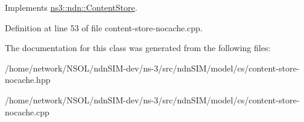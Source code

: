Implements \hyperlink{classns3_1_1ndn_1_1ContentStore_a1779f7f6214adcbe0213d85a48d8e94a}{ns3\+::ndn\+::\+Content\+Store}.



Definition at line 53 of file content-\/store-\/nocache.\+cpp.



The documentation for this class was generated from the following files\+:\begin{DoxyCompactItemize}
\item 
/home/network/\+N\+S\+O\+L/ndn\+S\+I\+M-\/dev/ns-\/3/src/ndn\+S\+I\+M/model/cs/content-\/store-\/nocache.\+hpp\item 
/home/network/\+N\+S\+O\+L/ndn\+S\+I\+M-\/dev/ns-\/3/src/ndn\+S\+I\+M/model/cs/content-\/store-\/nocache.\+cpp\end{DoxyCompactItemize}
